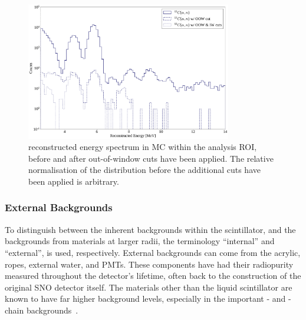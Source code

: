\begin{figure}
    \centering
    \includegraphics[width=0.8\textwidth]{6_SolarAnalysis/images/alphan_tagging_eff.pdf}
    \caption[\alphan{} reconstructed energy spectrum in MC within the analysis ROI, before and after out-of-window cuts have been applied]
    {\alphan{} reconstructed energy spectrum in MC within the analysis ROI, before and after out-of-window cuts have been applied. The relative normalisation of the distribution before the additional cuts have been applied is arbitrary.}
    \label{fig:alpha_n_coincidence_cut_impact}
\end{figure}


\subsubsection{External Backgrounds}
To distinguish between the inherent backgrounds within the scintillator, and the backgrounds from materials at larger radii, the terminology ``internal'' and ``external'', is used, respectively. External backgrounds can come from the acrylic, ropes, external water, and PMTs. These components have had their radiopurity measured throughout the detector's lifetime, often back to the construction of the original SNO detector itself. The materials other than the liquid scintillator are known to have far higher background levels, especially in the important - and -chain backgrounds~\cite{andringaCurrentStatusFuture2016}. %

